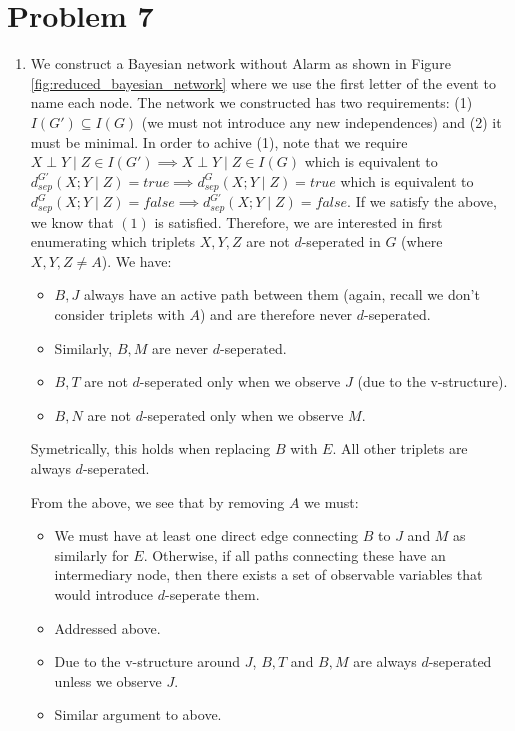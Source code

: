 \documentclass[12pt]{article}
\begin{document}
\section*{Problem 7}
\begin{enumerate}
\item We construct a Bayesian network without Alarm as shown in Figure \ref{fig:reduced_bayesian_network} where we use the first letter of the event to name each node. 
The network we constructed has two requirements: (1) $I(G') \subseteq I(G)$ (we must not introduce any new independences) and (2) it must be minimal. In order to achive (1), note that we require $X \perp Y \mid Z \in I(G') \implies X \perp Y \mid Z \in I(G)$ which is equivalent to $d_{sep}^{G'}(X;Y\mid Z) = true \implies d_{sep}^{G}(X;Y\mid Z) = true$ which is equivalent to $d_{sep}^G(X;Y \mid Z) = false \implies d_{sep}^{G'}(X;Y \mid Z) = false$. If we satisfy the above, we know that $(1)$ is satisfied. Therefore, we are interested in first enumerating which triplets $X,Y,Z$ are not $d$-seperated in $G$ (where $X,Y,Z \neq A$). We have:

\begin{itemize}
\item $B,J$ always have an active path between them (again, recall we don't consider triplets with $A$) and are therefore never $d$-seperated.
\item Similarly, $B,M$ are never $d$-seperated.
\item $B,T$ are not $d$-seperated only when we observe $J$ (due to the v-structure).
\item $B,N$ are not $d$-seperated only when we observe $M$.
\end{itemize}
Symetrically, this holds when replacing $B$ with $E$. All other triplets are always $d$-seperated.

From the above, we see that by removing $A$ we must:
\begin{itemize}
\item We must have at least one direct edge connecting $B$ to $J$ and $M$ as similarly for $E$. Otherwise, if all paths connecting these have an intermediary node, then there exists a set of observable variables that would introduce $d$-seperate them.
\item Addressed above.
\item Due to the v-structure around $J$, $B,T$ and $B,M$ are always $d$-seperated unless we observe $J$.
\item Similar argument to above.
\end{itemize}


\end{enumerate}
\end{document}
